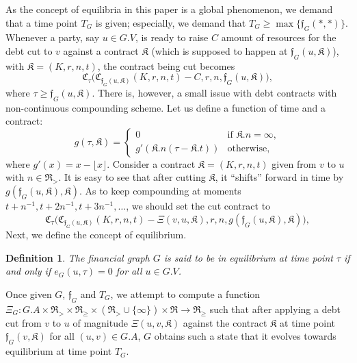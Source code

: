 \documentclass[10pt]{article}
\newcommand{\RR}{\mathfrak{R}}
\newcommand{\KK}{\mathfrak{K}}
\newcommand{\CC}{\mathfrak{C}}
\newcommand{\ff}{\mathfrak{f}}
\newtheorem{mydef}{Definition}
\begin{document}
As the concept of equilibria in this paper is a global phenomenon, we demand that a time point $T_G$ is given; especially, we demand that $T_G \geq \max \{ \ff_G(*, *) \}$. Whenever a party, say $u \in G.V$, is ready to raise $C$ amount of resources for the debt cut to $v$ against a contract $\KK$ (which is supposed to happen at $\ff_G(u, \KK)$), with $\KK = (K, r, n, t)$, the contract being cut becomes 
\[
\CC_{\tau}\big(\CC_{\ff_G(u, \KK)}(K, r, n, t) - C, r, n, \ff_G(u, \KK) \big),
\]
where $\tau \geq \ff_G(u, \KK)$.
There is, however, a small issue with debt contracts with non-continuous compounding scheme. Let us define a function of time and a contract:
\[
g(\tau, \KK) = \begin{cases}
0 & \mbox{if } \KK.n = \infty, \\
g'( \KK.n ( \tau - \KK.t ) ) & \mbox{otherwise,}
\end{cases}
\]
where $g'(x) = x - \lfloor x \rfloor$.
Consider a contract $\KK = (K, r, n, t)$ given from $v$ to $u$ with $n \in \RR_>$. It is easy to see that after cutting $\KK$, it ``shifts'' forward in time by $g(\ff_G(u, \KK), \KK)$. As to keep compounding at moments $t + n^{-1}, t + 2n^{-1}, t + 3n^{-1}, \dots$, we should set the cut contract to 
\[
\CC_{\tau}\bigg( \CC_{\ff_G(u, \KK)}(K, r, n, t) - \Xi(v, u, \KK), r, n, g(\ff_G(u, \KK), \KK) \bigg),
\]
Next, we define the concept of equilibrium.
\begin{mydef}
The financial graph $G$ is said to be in equilibrium at time point $\tau$ if and only if $e_G(u,\tau) = 0$ for all $u \in G.V$.
\end{mydef}
Once given $G$, $\ff_G$ and $T_G$, we attempt to compute a function $\Xi_G \colon G.A \times \RR_> \times \RR_{\geq} \times (\RR_> \cup \{ \infty \}) \times \RR \to \RR_{\geq}$ such that after applying a debt cut from $v$ to $u$ of magnitude $\Xi(u, v, \KK)$ against the contract $\KK$ at time point $\ff_G(v, \KK)$ for  all $(u, v) \in G.A$, $G$ obtains such a state that it evolves towards equilibrium at time point $T_G$.
\end{document}
